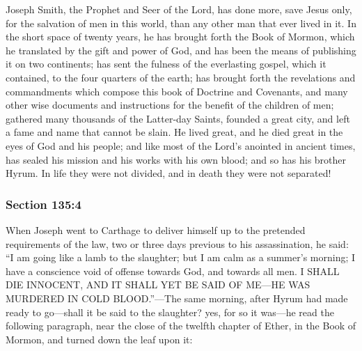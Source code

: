 		Joseph Smith, the Prophet and Seer of the Lord, has done more, save Jesus only, for the salvation of men in this world, than any other man that ever lived in it.  In the short space of twenty years, he has brought forth the Book of Mormon, which he translated by the gift and power of God, and has been the means of publishing it on two continents; has sent the fulness of the everlasting gospel, which it contained, to the four quarters of the earth; has brought forth the revelations and commandments which compose this book of Doctrine and Covenants, and many other wise documents and instructions for the benefit of the children of men; gathered many thousands of the Latter-day Saints, founded a great city, and left a fame and name that cannot be slain.  He lived great, and he died great in the eyes of God and his people; and like most of the Lord's anointed in ancient times, has sealed his mission and his works with his own blood; and so has his brother Hyrum.  In life they were not divided, and in death they were not separated!


	\subsubsection{Section 135:4} %
		\label{DC135-4}

		When Joseph went to Carthage to deliver himself up to the pretended requirements of the law, two or three days previous to his assassination, he said: ``I am going like a lamb to the slaughter; but I am calm as a summer's morning; I have a conscience void of offense towards God, and towards all men.  I SHALL DIE INNOCENT, AND IT SHALL YET BE SAID OF ME—HE WAS MURDERED IN COLD BLOOD.''—The same morning, after Hyrum had made ready to go—shall it be said to the slaughter?  yes, for so it was—he read the following paragraph, near the close of the twelfth chapter of Ether, in the Book of Mormon, and turned down the leaf upon it:


